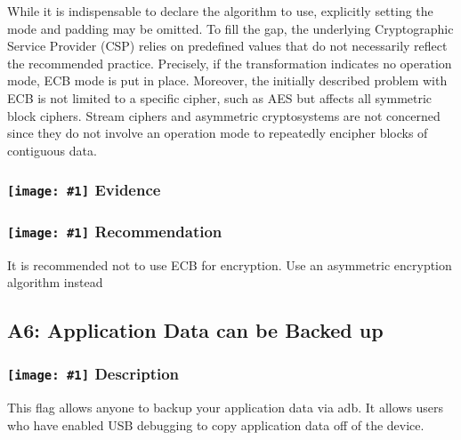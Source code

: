 \documentclass[12p]{article}
\newcommand{\icon}[1]{\texttt{[image: \#1]}}
\begin{document}
            While it is indispensable to declare the algorithm to use, explicitly setting the mode and
            padding may be omitted. To fill the gap, the underlying Cryptographic Service Provider (CSP)
            relies on predefined values that do not necessarily reflect the recommended practice. Precisely, if
            the transformation indicates no operation mode, ECB mode is put in place. Moreover, the initially
            described problem with ECB is not limited to a specific cipher, such as AES but affects all symmetric
            block ciphers. Stream ciphers and asymmetric cryptosystems are not concerned since they
            do not involve an operation mode to repeatedly encipher blocks of contiguous data.
        
\subsubsection*{\protect\icon{/home/miki/Documents/GITHUB/AndroidPermissions/python/vulns/report_icons/basic_magnifier.png} Evidence}



\subsubsection*{\protect\icon{/home/miki/Documents/GITHUB/AndroidPermissions/python/vulns/report_icons/basic_todo.png} Recommendation}
It is recommended not to use ECB for encryption. Use an asymmetric encryption algorithm instead
\subsection{A6: Application Data can be Backed up}
\subsubsection*{\protect\icon{/home/miki/Documents/GITHUB/AndroidPermissions/python/vulns/report_icons/basic_sheet.png} Description}
This flag allows anyone to backup your application data via adb. It allows users who have enabled USB debugging to copy application data off of the device.
\end{document}
